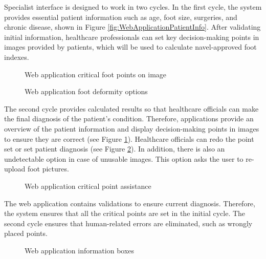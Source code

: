 Specialist interface is designed to work in two cycles. In the first cycle, the system provides essential patient information such as age, foot size, surgeries, and chronic disease, shown in Figure \ref{fig:WebApplicationPatientInfo}. After validating initial information, healthcare professionals can set key decision-making points in images provided by patients, which will be used to calculate navel-approved foot indexes. 

\begin{figure}[htbp]
\centering
{}
\caption{Web application critical foot points on image}
\label{fig:WebApplicationFootPoints}
\end{figure}

\begin{figure}[htbp]
\centering
{}
\caption{Web application foot deformity options}
\label{fig:WebApplicationSetFootDeformity}
\end{figure}

The second cycle provides calculated results so that healthcare officials can make the final diagnosis of the patient's condition. Therefore, applications provide an overview of the patient information and display decision-making points in images to ensure they are correct (see Figure \ref{fig:WebApplicationFootPoints}). Healthcare officials can redo the point set or set patient diagnosis (see Figure \ref{fig:WebApplicationSetFootDeformity}). In addition, there is also an undetectable option in case of unusable images. This option asks the user to re-upload foot pictures.

\begin{figure}[htbp]
\centering
{}
\caption{Web application critical point assistance}
\label{fig:WebApplicationCriticalPointAssistance}
\end{figure}

The web application contains validations to ensure current diagnosis. Therefore, the system ensures that all the critical points are set in the initial cycle. The second cycle ensures that human-related errors are eliminated, such as wrongly placed points. 

\begin{figure}[htbp]
\centering
{}
\caption{Web application information boxes}
\label{fig:WebApplicationInformationBoxes}
\end{figure}

